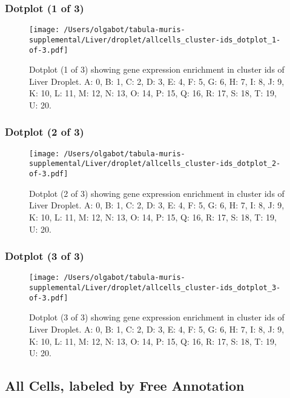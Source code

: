 \clearpage
\clearpage
\subsubsection{Dotplot (1 of 3)}
\begin{figure}[h]
\centering
\texttt{[image: /Users/olgabot/tabula-muris-supplemental/Liver/droplet/allcells\_cluster-ids\_dotplot\_1-of-3.pdf]}

\caption{ Dotplot (1 of 3)  showing gene expression enrichment in cluster ids of Liver Droplet. A: 0, B: 1, C: 2, D: 3, E: 4, F: 5, G: 6, H: 7, I: 8, J: 9, K: 10, L: 11, M: 12, N: 13, O: 14, P: 15, Q: 16, R: 17, S: 18, T: 19, U: 20.}
\end{figure}


\clearpage
\clearpage
\subsubsection{Dotplot (2 of 3)}
\begin{figure}[h]
\centering
\texttt{[image: /Users/olgabot/tabula-muris-supplemental/Liver/droplet/allcells\_cluster-ids\_dotplot\_2-of-3.pdf]}

\caption{ Dotplot (2 of 3)  showing gene expression enrichment in cluster ids of Liver Droplet. A: 0, B: 1, C: 2, D: 3, E: 4, F: 5, G: 6, H: 7, I: 8, J: 9, K: 10, L: 11, M: 12, N: 13, O: 14, P: 15, Q: 16, R: 17, S: 18, T: 19, U: 20.}
\end{figure}


\clearpage
\clearpage
\subsubsection{Dotplot (3 of 3)}
\begin{figure}[h]
\centering
\texttt{[image: /Users/olgabot/tabula-muris-supplemental/Liver/droplet/allcells\_cluster-ids\_dotplot\_3-of-3.pdf]}

\caption{ Dotplot (3 of 3)  showing gene expression enrichment in cluster ids of Liver Droplet. A: 0, B: 1, C: 2, D: 3, E: 4, F: 5, G: 6, H: 7, I: 8, J: 9, K: 10, L: 11, M: 12, N: 13, O: 14, P: 15, Q: 16, R: 17, S: 18, T: 19, U: 20.}
\end{figure}


\clearpage
\subsection{All Cells, labeled by Free Annotation}
